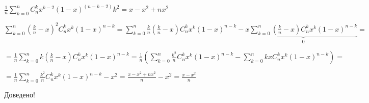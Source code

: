 $
\frac{1}{n}\sum\limits_{k=0}^{n}C_n^kx^{k - 2}(1 - x)^{(n - k -2)}k^2=
x - x^2 + nx^2
$



$ \sum\limits_{k=0}^{n}(\frac{k}{n} - x)^2 C_n^kx^k(1-x)^{n-k} = 
\sum\limits_{k=0}^{n}\frac{k}{n}(\frac{k}{n} - x) C_n^kx^k(1-x)^{n-k} - 
x\underbrace{\sum\limits_{k=0}^{n}(\frac{k}{n} - x) C_n^kx^k(1-x)^{n-k}}_{\mbox{0}} = $


$=\frac{1}{n}\sum\limits_{k=0}^{n}k(\frac{k}{n} - x) C_n^kx^k(1-x)^{n-k} = 
\frac{1}{n}(\sum\limits_{k=0}^{n}\frac{k^2}{n} C_n^kx^k(1-x)^{n-k} - 
\sum\limits_{k=0}^{n}kxC_n^kx^k(1-x)^{n-k})=$


$=\frac{1}{n}\sum\limits_{k=0}^{n}\frac{k^2}{n} C_n^kx^k(1-x)^{n-k} - 
x^2 = \frac{x - x^2 +nx^2}{n} - x^2 =\frac{x - x^2}{n}$


Доведено!
